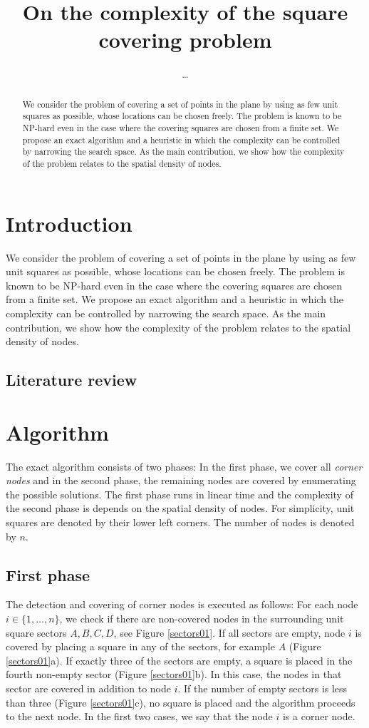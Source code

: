 \documentclass{article}
\title{On the complexity of the square covering problem}
\author{\ldots}
\begin{document}
\maketitle
\begin{abstract}
We consider the problem of covering a set of points in the plane by 
using as few unit squares as possible, whose locations can be chosen freely. 
The problem is known to be NP-hard even in the case where the covering 
squares are chosen from a finite set. We propose an exact algorithm and a heuristic
in which the complexity can be controlled by narrowing the search space.
As the main contribution, we show how the complexity of the problem relates to the 
spatial density of nodes.
\end{abstract}
\section{Introduction}
We consider the problem of covering a set of points in the plane by 
using as few unit squares as possible, whose locations can be chosen freely. 
The problem is known to be NP-hard even in the case where the covering 
squares are chosen from a finite set. We propose an exact algorithm and a heuristic
in which the complexity can be controlled by narrowing the search space.
As the main contribution, we show how the complexity of the problem relates to the 
spatial density of nodes.

\subsection{Literature review}

\section{Algorithm}
The exact algorithm consists of two phases: In the first phase, we cover all \emph{corner nodes} 
and in the second phase, the remaining nodes are covered by enumerating the
possible solutions. The first phase runs in linear time and the complexity of the 
second phase is depends on the spatial density of nodes. For simplicity, unit squares 
are denoted by their lower left corners. The number of nodes is denoted by $n$.
\subsection{First phase}
The detection and covering of corner nodes is executed as follows: For each node $i \in \{1,\ldots,n\}$,
we check if there are non-covered nodes in the surrounding unit square sectors $A,B,C,D$, see Figure \ref{sectors01}. 
If all sectors are empty, node $i$ is covered by placing a square in any of the
sectors, for example $A$ (Figure \ref{sectors01}a). If exactly three of the sectors are empty, a square is placed in 
the fourth non-empty sector (Figure \ref{sectors01}b). 
In this case, the nodes in that sector are covered in addition to node $i$.
If the number of empty sectors is less than three (Figure \ref{sectors01}c), no square is placed and 
the algorithm proceeds to the next node.
In the first two cases, we say that the node $i$ is a corner node.
\end{document}
